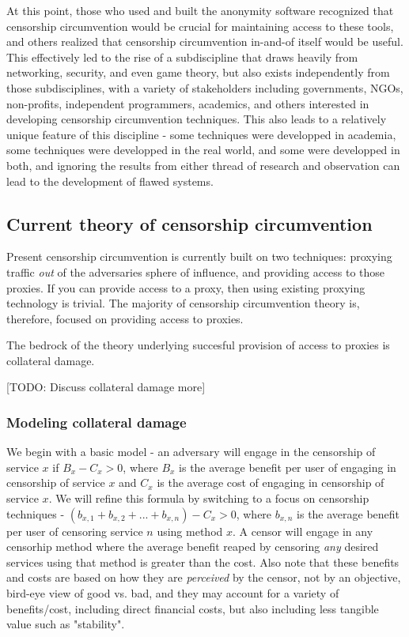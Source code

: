\documentclass[12pt]{report}
\begin{document}
At this point, those who used and built the anonymity software recognized that censorship circumvention would be crucial for maintaining access to these tools, and others realized that censorship circumvention in-and-of itself would be useful. This effectively led to the rise of a subdiscipline that draws heavily from networking, security, and even game theory, but also exists independently from those subdisciplines, with a variety of stakeholders including governments, NGOs, non-profits, independent programmers, academics, and others interested in developing censorship circumvention techniques. This also leads to a relatively unique feature of this discipline - some techniques were developped in academia, some techniques were developped in the real world, and some were developped in both, and ignoring the results from either thread of research and observation can lead to the development of flawed systems.

\subsection{Current theory of censorship circumvention}

Present censorship circumvention is currently built on two techniques: proxying traffic \emph{out} of the adversaries sphere of influence, and providing access to those proxies. If you can provide access to a proxy, then using existing proxying technology is trivial. The majority of censorship circumvention theory is, therefore, focused on providing access to proxies.

The bedrock of the theory underlying succesful provision of access to proxies is collateral damage.

[TODO: Discuss collateral damage more]

\subsubsection{Modeling collateral damage}

We begin with a basic model - an adversary will engage in the censorship of service $x$ if $B_x - C_x > 0$, where $B_x$ is the average benefit per user of engaging in censorship of service $x$ and $C_x$ is the average cost of engaging in censorship of service $x$. We will refine this formula by switching to a focus on censorship techniques - $(b_{x,1} + b_{x,2} + ... + b_{x,n}) - C_x > 0$, where $b_{x,n}$ is the average benefit per user of censoring service $n$ using method $x$. A censor will engage in any censorhip method where the average benefit reaped by censoring \emph{any} desired services using that method is greater than the cost. Also note that these benefits and costs are based on how they are \emph{perceived} by the censor, not by an objective, bird-eye view of good vs. bad, and they may account for a variety of benefits/cost, including direct financial costs, but also including less tangible value such as "stability".
\end{document}
